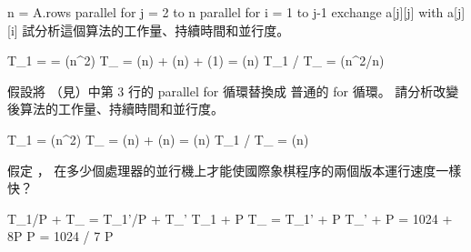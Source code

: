 \startCLRS
n = A.rows
parallel for j = 2 to n
	parallel for i = 1 to j-1
		exchange a[j][j] with a[j][i]
\stopCLRS
試分析這個算法的工作量、持續時間和並行度。
\stopEXERCISE

\startANSWER
\startformula\startmathalignment
\NC T_1 \NC =  = \Theta(n^2) \NR
\NC T_{\infty} \NC = \Theta(\lg n) + \Theta(\lg n) + \Theta(1) = \Theta(\lg n) \NR
\NC T_1 / T_{\infty} \NC = \Theta(n^2/\lg n) \NR
\stopmathalignment\stopformula
\stopANSWER

\startEXERCISE
假設將  （見）中第 3 行的 {\EMP parallel for} 循環替換成
普通的 {\EMP for} 循環。
請分析改變後算法的工作量、持續時間和並行度。
\stopEXERCISE

\startANSWER
\startformula\startmathalignment
\NC T_1 \NC = \Theta(n^2) \NR
\NC T_{\infty} \NC = \Theta(\lg n) + \Theta(n) = \Theta(n) \NR
\NC T_1 / T_{\infty} \NC = \Theta(n) \NR
\stopmathalignment\stopformula
\stopANSWER

\startEXERCISE
假定 ，
在多少個處理器的並行機上才能使國際象棋程序的兩個版本運行速度一樣快？
\stopEXERCISE

\startANSWER
\startformula\startmathalignment
\NC T_1/P + T_{\infty} \NC = T_{1}'/P + T_{\infty}' \NR
\NC T_1 + P T_{\infty} \NC = T_{1}' + P T_{\infty}' \NR
{} + P \NC = 1024 + 8P \NR
\NC P \NC = 1024 / 7 \NR
\NC P \NC {} \NR
\stopmathalignment\stopformula
\stopANSWER

\stopsection
